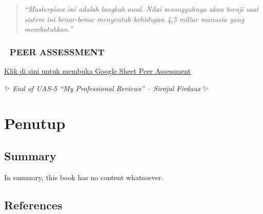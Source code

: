 \documentclass[
  letterpaper,
  DIV=11,
  numbers=noendperiod]{scrreprt}
\begin{document}
\begin{quote}
\emph{``Masterpiece ini adalah langkah awal. Nilai sesungguhnya akan
teruji saat sistem ini benar-benar menyentuh kehidupan 4,5 miliar
manusia yang membutuhkan.''}
\end{quote}

\section{🔗 PEER ASSESSMENT}\label{peer-assessment}

\href{https://docs.google.com/spreadsheets/d/12zv_Pm0vs1XsoaxnvMX4oyUl7O8oX8lT/edit?usp=sharing&ouid=111994471425383838960&rtpof=true&sd=true}{Klik
di sini untuk membuka Google Sheet Peer Assessment}

✨ \emph{End of UAS-5 ``My Professional Reviews'' -- Sirojul Firdaus} ✨

\part{Penutup}

\chapter{Summary}\label{summary}

In summary, this book has no content whatsoever.

\chapter*{References}\label{references}


\label{refs}
\end{document}
